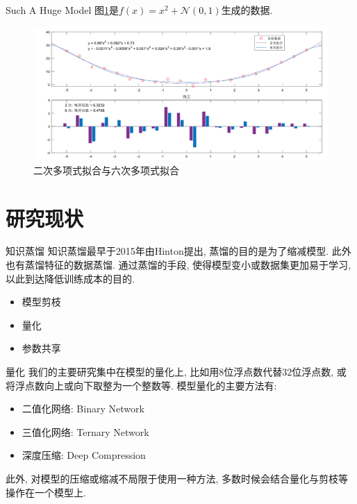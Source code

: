 \documentclass{beamer}
\begin{document}
\begin{frame}{Such A Huge Model}
    \footnotesize
    图\ref{fig:fit26}是$f(x) = x^2 + \mathcal{N}(0,1)$生成的数据.
    \begin{figure}[H]
        \centering
        \includegraphics[scale=0.4]{pic/morepar.pdf}
        \caption{二次多项式拟合与六次多项式拟合}
        \label{fig:fit26}
    \end{figure}
\end{frame}


\section{研究现状}

\begin{frame}{知识蒸馏}
    知识蒸馏\cite{hinton2015distilling}最早于2015年由Hinton提出, 蒸馏的目的是为了缩减模型. 此外也有蒸馏特征的数据蒸馏\cite{wang2018dataset}. 通过蒸馏的手段, 使得模型变小或数据集更加易于学习, 以此到达降低训练成本的目的.
    \begin{itemize}
        \item 模型剪枝
        \item 量化
        \item 参数共享
    \end{itemize}
\end{frame}

\begin{frame}{量化}
    \footnotesize
    我们的主要研究集中在模型的量化上, 比如用$8$位浮点数代替$32$位浮点数, 或将浮点数向上或向下取整为一个整数等. 模型量化的主要方法有:
    \begin{itemize}
        \item 二值化网络: Binary Network \cite{courbariaux2015binaryconnect}
        \item 三值化网络: Ternary Network \cite{li2016ternary}
        \item 深度压缩: Deep Compression \cite{han2015deep}
    \end{itemize}
    此外, 对模型的压缩或缩减不局限于使用一种方法, 多数时候会结合量化与剪枝等操作在一个模型上.
    
\end{frame}
\end{document}
